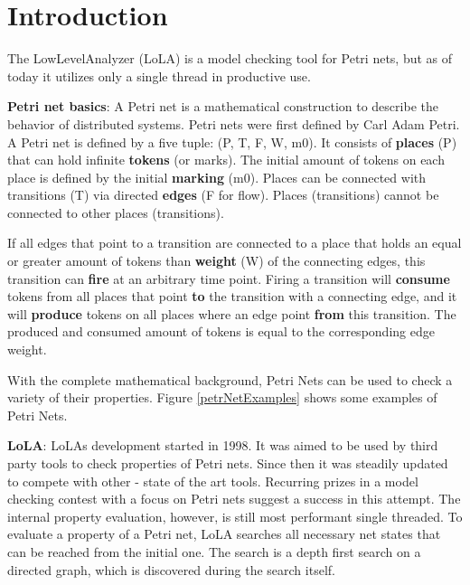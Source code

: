 \chapter{Introduction}
\label{introduction}

The LowLevelAnalyzer (LoLA) is a model checking tool for Petri nets, but as of today it utilizes only a single thread in productive use.

\textbf{Petri net basics}:
A Petri net is a mathematical construction to describe the behavior of distributed systems. Petri nets were first defined by Carl Adam Petri\cite{Petri1962kommunikation}. A Petri net is defined by a five tuple: (P, T, F, W, m0). It consists of \textbf{places} (P) that can hold infinite \textbf{tokens} (or marks). The initial amount of tokens on each place is defined by the initial \textbf{marking} (m0). Places can be connected with transitions (T) via directed \textbf{edges} (F for flow). Places (transitions) cannot be connected to other places (transitions). 

If all edges that point to a transition are connected to a place that holds an equal or greater amount of tokens than \textbf{weight} (W) of the connecting edges, this transition can \textbf{fire} at an arbitrary time point. Firing a transition will \textbf{consume} tokens from all places that point \textbf{to} the transition with a connecting edge, and it will \textbf{produce} tokens on all places where an edge point \textbf{from} this transition. The produced and consumed amount of tokens is equal to the corresponding edge weight.

With the complete mathematical background, Petri Nets can be used to check a variety of their properties. Figure \ref{petrNetExamples} shows some examples of Petri Nets.



\textbf{LoLA}:
LoLAs development started in 1998. It was aimed to be used by third party tools to check properties of Petri nets\cite{schmidt2000lola}. Since then it was steadily updated to compete with other - state of the art tools. Recurring prizes in a model checking contest with a focus on Petri nets suggest a success in this attempt\cite{MCC2017}.
The internal property evaluation, however, is still most performant single threaded. To evaluate a property of a Petri net, LoLA searches all necessary net states that can be reached from the initial one. The search is a depth first search on a directed graph, which is discovered during the search itself.

